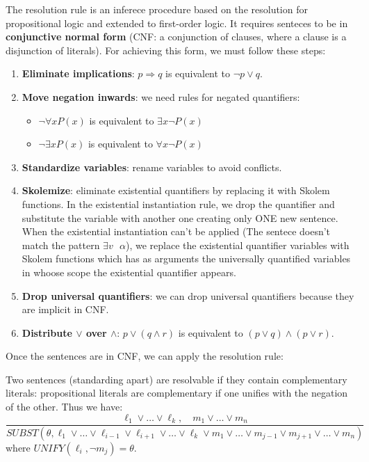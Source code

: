 \documentclass[12pt]{article}
\begin{document}
\begin{enumerate}[label=\textbf{FOL.\arabic*}]
    The resolution rule is an inferece procedure based on the resolution for propositional logic and extended to first-order logic.
    It requires senteces to  be in \textbf{conjunctive normal form} (CNF\@: a conjunction of clauses, where a clause is a disjunction of literals).
    For achieving this form, we must follow these steps:
    \begin{enumerate}
        \item \textbf{Eliminate implications}: $p\Rightarrow q$ is equivalent to $\lnot p\lor q$.
        \item \textbf{Move negation inwards}: we need rules for negated quantifiers:
        \begin{itemize}
            \item $\lnot\forall x P(x)$ is equivalent to $\exists x \lnot P(x)$
            \item $\lnot\exists x P(x)$ is equivalent to $\forall x \lnot P(x)$
        \end{itemize}
        \item \textbf{Standardize variables}: rename variables to avoid conflicts.
        \item \textbf{Skolemize}: eliminate existential quantifiers by replacing it with Skolem functions.
        In the existential instantiation rule, we drop the quantifier and substitute the variable with another one creating only ONE new sentence.
        When the existential instantiation can't be applied (The sentece doesn't match the pattern $\exists v\text{  }\alpha$), we replace 
        the existential quantifier variables with Skolem functions which has as arguments the universally quantified variables in whoose scope the existential quantifier appears.

        \item \textbf{Drop universal quantifiers}: we can drop universal quantifiers because they are implicit in CNF\@.
        \item \textbf{Distribute $\lor$ over $\land$}: $p\lor(q\land r)$ is equivalent to $(p\lor q)\land(p\lor r)$.
    \end{enumerate}

    Once the sentences are in CNF, we can apply the resolution rule:

    Two sentences (standarding apart) are resolvable if they contain complementary literals: propositional literals are complementary if one unifies with the negation of the other.
    Thus we have:
    \begin{equation}
        \frac{\ell_1\lor\ldots\lor \ell_k,\quad m_1\lor\ldots\lor m_n}
        {SUBST(\theta,\ell_1\lor\ldots\lor\ell_{i-1}\lor\ell_{i+1}\lor\ldots\lor\ell_k\lor m_1\lor\ldots\lor m_{j-1}\lor m_{j+1}\lor\ldots\lor m_n)}
    \end{equation}
    where $UNIFY(\ell_i,\lnot m_j) = \theta$.


\end{enumerate}
\end{document}

